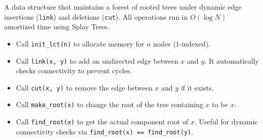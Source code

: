 
A data structure that maintains a forest of rooted trees under dynamic edge insertions (\lstinline|link|) and deletions (\lstinline|cut|). All operations run in $O(\log N)$ amortized time using Splay Trees.



\begin{itemize}
    \item Call \lstinline|init_lct(n)| to allocate memory for $n$ nodes ($1$-indexed).
    \item Call \lstinline|link(x, y)| to add an undirected edge between $x$ and $y$. It automatically checks connectivity to prevent cycles.
    \item Call \lstinline|cut(x, y)| to remove the edge between $x$ and $y$ if it exists.
    \item Call \lstinline|make_root(x)| to change the root of the tree containing $x$ to be $x$.
    \item Call \lstinline|find_root(x)| to get the actual component root of $x$. Useful for dynamic connectivity checks via \lstinline|find_root(x) == find_root(y)|.
\end{itemize}
